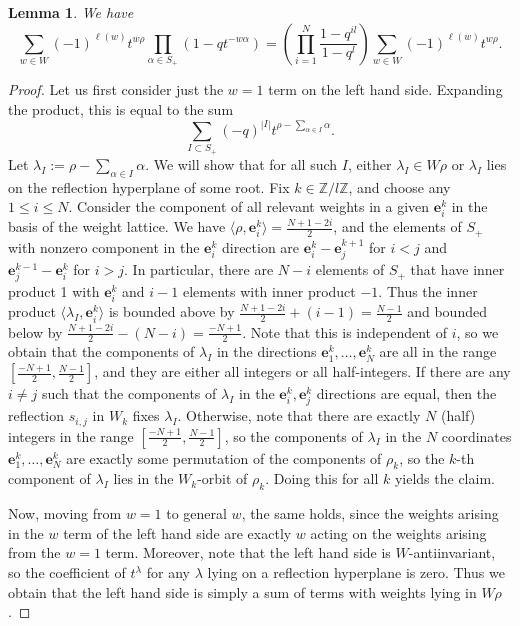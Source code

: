 \documentclass[12pt]{article}
\renewcommand{\b}[1]{\textbf{#1}}
\newcommand{\Z}{\mathbb{Z}}
\newtheorem{lemma}[theorem]{Lemma}
\theoremstyle{definition}
\theoremstyle{remark}
\begin{document}
\begin{lemma}\label{lem:eqdim}
    We have
    \[\sum_{w\in W}(-1)^{\ell(w)}t^{w\rho}\prod_{\alpha\in S_+}(1-qt^{-w\alpha})=\left(\prod_{i=1}^N\frac{1-q^{il}}{1-q^l}\right)\sum_{w\in W}(-1)^{\ell(w)}t^{w\rho}.\]
\end{lemma}

\begin{proof}
    Let us first consider just the $w=1$ term on the left hand side. Expanding the product, this is equal to the sum
    \[\sum_{I\subset S_+}(-q)^{|I|}t^{\rho-\sum_{\alpha\in I}\alpha}.\]
    Let $\lambda_I:=\rho-\sum_{\alpha\in I}\alpha$. We will show that for all such $I$, either $\lambda_I\in W\rho$ or $\lambda_I$ lies on the reflection hyperplane of some root. Fix $k\in\Z/l\Z$, and choose any $1\leq i\leq N$. Consider the component of all relevant weights in a given $\b{e}_i^k$ in the basis of the weight lattice. We have $\langle\rho,\b{e}_i^k\rangle=\frac{N+1-2i}{2}$, and the elements of $S_+$ with nonzero component in the $\b{e}_i^k$ direction are $\b{e}_i^k-\b{e}_j^{k+1}$ for $i<j$ and $\b{e}_j^{k-1}-\b{e}_i^k$ for $i>j$. In particular, there are $N-i$ elements of $S_+$ that have inner product 1 with $\b{e}_i^k$ and $i-1$ elements with inner product $-1$. Thus the inner product $\langle\lambda_I,\b{e}_i^k\rangle$ is bounded above by $\frac{N+1-2i}{2}+(i-1)=\frac{N-1}{2}$ and bounded below by $\frac{N+1-2i}{2}-(N-i)=\frac{-N+1}{2}$. Note that this is independent of $i$, so we obtain that the components of $\lambda_I$ in the directions $\b{e}_1^k,\dots,\b{e}_N^k$ are all in the range $[\frac{-N+1}{2},\frac{N-1}{2}]$, and they are either all integers or all half-integers. If there are any $i\neq j$ such that the components of $\lambda_I$ in the $\b{e}_i^k,\b{e}_j^k$ directions are equal, then the reflection $s_{i,j}$ in $W_k$ fixes $\lambda_I$. Otherwise, note that there are exactly $N$ (half) integers in the range $[\frac{-N+1}{2},\frac{N-1}{2}]$, so the components of $\lambda_I$ in the $N$ coordinates $\b{e}_1^k,\dots,\b{e}_N^k$ are exactly some permutation of the components of $\rho_k$, so the $k$-th component of $\lambda_I$ lies in the $W_k$-orbit of $\rho_k$. Doing this for all $k$ yields the claim.

    Now, moving from $w=1$ to general $w$, the same holds, since the weights arising in the $w$ term of the left hand side are exactly $w$ acting on the weights arising from the $w=1$ term. Moreover, note that the left hand side is $W$-antiinvariant, so the coefficient of $t^\lambda$ for any $\lambda$ lying on a reflection hyperplane is zero. Thus we obtain that the left hand side is simply a sum of terms with weights lying in $W\rho$.


\end{proof}
\end{document}

